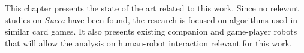 \label{chapter:related-work}

This chapter presents the state of the art related to this work.
Since no relevant studies on \emph{Sueca} have been found, the research is focused on algorithms used in similar card games.
It also presents existing companion and game-player robots that will allow the analysis on human-robot interaction relevant for this work.



